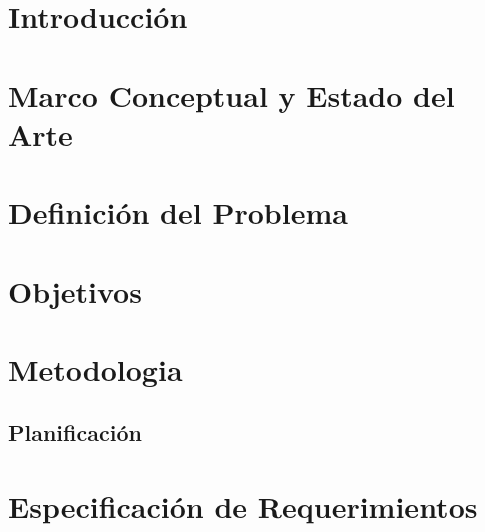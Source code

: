 \documentclass[12pt,letterpaper]{report}
\def\listtablename{Índice de tablas}
\def\tablename{Tabla}}
\begin{document}
\tableofcontents
\newpage


\listoffigures
\newpage

\renewcommand{\listtablename}{Índice de tablas} 
\renewcommand{\tablename}{Tabla} 

\listoftables
\newpage



\chapter{Introducci\'on}
\label{ch:Intro}


\chapter{Marco Conceptual y Estado del Arte}
\label{ch:MC}


\chapter{Definición del Problema }
\label{ch:Problema}


\chapter{Objetivos}
\label{ch:OG}


\chapter{Metodologia}
\label{ch:Met}


\section{Planificación}
\label{ch:Plan}


\chapter{Especificación de Requerimientos}
\label{ch:req}

\end{document}

